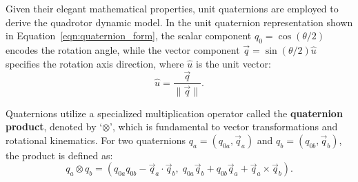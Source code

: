 






Given their elegant mathematical properties, unit quaternions are employed to derive the quadrotor dynamic model. In the unit quaternion representation shown in Equation~\ref{eqn:quaternion_form}, the scalar component $q_0 = \cos(\theta/2)$ encodes the rotation angle, while the vector component $\vec{q} = \sin(\theta/2)\hat{u}$ specifies the rotation axis direction, where $\hat{u}$ is the unit vector:
\begin{equation}
\hat{u} = \frac{\vec{q}}{\|\vec{q}\|}.
\label{eqn:rotation_axis}
\end{equation}

Quaternions utilize a specialized multiplication operator called the \textbf{quaternion product}, denoted by `$\otimes$', which is fundamental to vector transformations and rotational kinematics. For two quaternions $q_a = (q_{0a}, \vec{q}_a)$ and $q_b = (q_{0b}, \vec{q}_b)$, the product is defined as:
\begin{equation}
q_a \otimes q_b = \left( q_{0a}q_{0b} - \vec{q}_a \cdot \vec{q}_b, \; q_{0a}\vec{q}_b + q_{0b}\vec{q}_a + \vec{q}_a \times \vec{q}_b \right).
\label{eqn:quaternion_product}
\end{equation}

